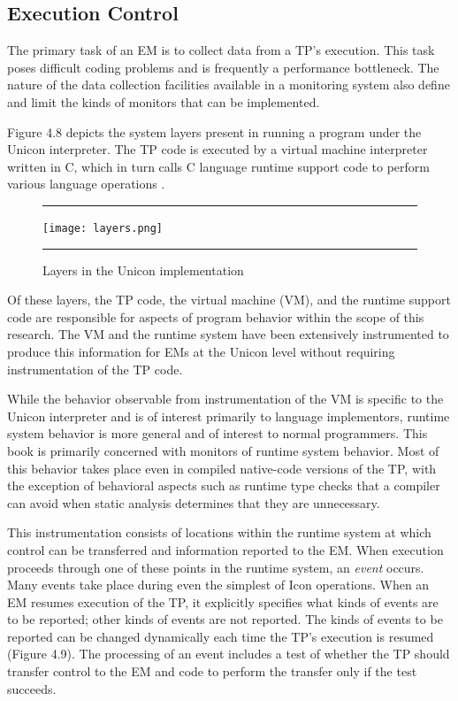 \subsection{Execution Control}

The primary task of an EM is to collect data from a TP's execution.
This task poses difficult coding problems and is frequently a
performance bottleneck. The nature of the data collection facilities
available in a monitoring system also define and limit the kinds of
monitors that can be implemented.

Figure 4.8 depicts the system layers present in running a
program under the Unicon interpreter.  The TP code is executed by a
virtual machine interpreter written in C, which in turn calls C
language runtime support code to perform various language operations
\cite{Griswold86}.

\begin{figure}[tb]
\hrule\bigskip
\centering

\hspace{0.05in}\texttt{[image: layers.png]}

\caption{Layers in the Unicon implementation}
\medskip\hrule
\vspace{12pt}
\end{figure}

Of these layers, the TP code, the virtual machine (VM), and the runtime
support code are responsible for aspects of program behavior within the
scope of this research.  The VM and the runtime system have been
extensively instrumented to produce this information for EMs at the Unicon
level without requiring instrumentation of the TP code.

While the behavior observable from instrumentation of the VM is specific to
the Unicon interpreter and is of interest primarily to language implementors,
runtime system behavior is more general and of interest to normal
programmers.  This book is primarily concerned with monitors of runtime
system behavior.  Most of this behavior takes place even in compiled
native-code versions of the TP, with the exception of behavioral
aspects such as
runtime type checks that a compiler can avoid when static analysis
determines that they are unnecessary.

This instrumentation consists of locations within the runtime
system at which control can be transferred and information reported to
the EM.  When execution proceeds through one of these points in the
runtime system, an {\em event\/} occurs.
Many events take place during even the simplest of Icon operations.
When an EM resumes execution of the TP, it explicitly specifies what
kinds of events are to be reported; other kinds of events are not
reported. The kinds of events to be reported can be
changed dynamically each time the TP's execution is resumed (Figure 4.9).
The processing of an event
includes a test of whether the TP should transfer control to the EM
and code to perform the transfer only if the test succeeds.

